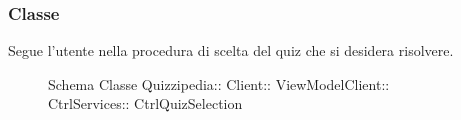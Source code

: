 \subsubsection{Classe }
Segue l'utente nella procedura di scelta del quiz che si desidera risolvere.
\begin{figure}[H]
\centering
\noindent{}
\caption[Schema Classe CtrlQuizSelection]{Schema Classe Quizzipedia:: Client:: ViewModelClient:: CtrlServices:: CtrlQuizSelection}
\end{figure}
